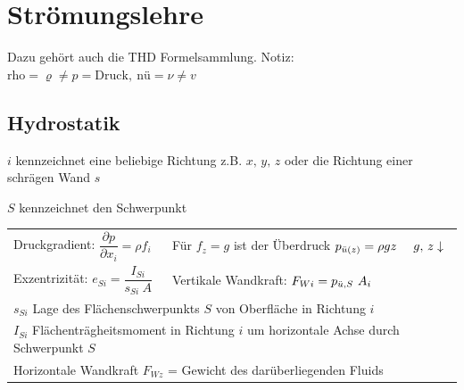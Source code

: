 \setcounter{section}{1} %
		
\section{Strömungslehre}
	Dazu gehört auch die THD Formelsammlung. Notiz: $ \text{rho} = \varrho \neq p = \text{Druck}, \ \text{nü} = \nu \neq v  $

\subsection{Hydrostatik}
	$ i $ kennzeichnet eine beliebige Richtung z.B. $ x,\, y,\, z $ oder die Richtung einer schrägen Wand $ s $
	
	$ S $ kennzeichnet den Schwerpunkt
	
	\begin{center}
		\setlength{\tabcolsep}{1.5em} %
		\begin{tabular}{ll}
			  Druckgradient: $ \dfrac{\partial p}{\partial x_i} = \rho f_i$ 
			& Für $ f_z = g $ ist der Überdruck $ p_{\ddot{u}(z)} = \rho g z \quad \ g,\, z \downarrow$
			\\
			  Exzentrizität:       $ e_{Si} = \dfrac{I_{Si}}{s_{Si} \ A}$
			& Vertikale Wandkraft: $ F_{Wi} = p_{\ddot{u},S} \ A_i $
			\\
			  \multicolumn{2}{l}{$ s_{Si} $ Lage des Flächenschwerpunkts $ S $ von Oberfläche in Richtung $ i $}
			\\
			  \multicolumn{2}{l}{$ I_{Si} $ Flächenträgheitsmoment in Richtung $ i $ um horizontale Achse durch Schwerpunkt $ S $ }
			\\
			  \multicolumn{2}{l}{Horizontale Wandkraft 	$ F_{Wz} $ = Gewicht des darüberliegenden Fluids}
		\end{tabular}
	\end{center}

